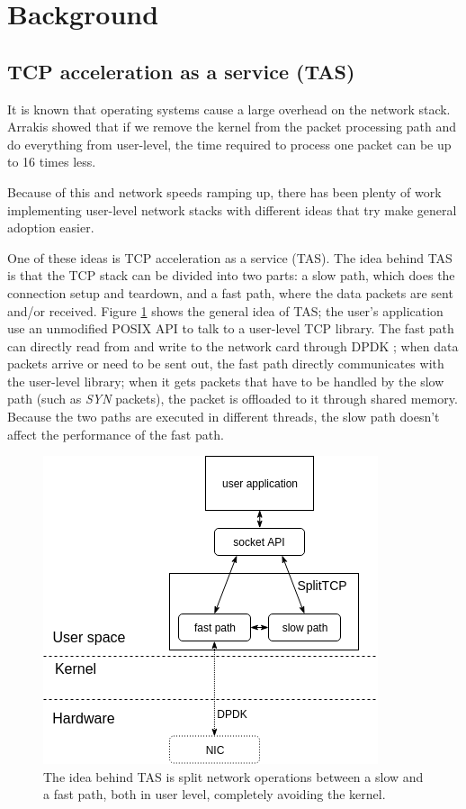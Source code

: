 \section{Background}\label{Background}

%
%

\subsection{TCP acceleration as a service (TAS)}

It is known that operating systems cause a large overhead on the network
stack. Arrakis \cite{peter:arrakis} showed that if we remove the kernel
from the packet processing path and do everything from user-level, the time 
required to process one packet can be up to 16 times less.

Because of this and network speeds ramping up, there has been plenty of work implementing
user-level network stacks \cite{mtcp, utcp, janus, alpine, lwip, fstack} with different ideas that try make general adoption
easier.

One of these ideas is TCP acceleration as a service (TAS).
The idea behind TAS is that the TCP stack can be divided into two parts: a slow path, which does the connection
setup and teardown, and a fast path, where the data packets are sent and/or received. Figure \ref{fig:splittcp} 
shows the general idea of TAS; the user's application use an unmodified POSIX API to talk to a user-level TCP
library. The fast path can directly read from and write to the network card through DPDK \cite{dpdk}; when data packets
arrive or need to be sent out, the fast path directly communicates with the user-level library;
when it gets packets that have to be handled by the slow path (such as \textit{SYN} packets), the packet 
is offloaded to it through shared memory. Because the two paths are executed in different threads, the slow path doesn't
affect the performance of the fast path.


\begin{figure}
\centering
\includegraphics[width=0.7\columnwidth]{figures/splittcp_default.png}
\caption{The idea behind TAS is split network operations between a slow and a fast path, both in user level, completely
avoiding the kernel.}
\label{fig:splittcp}
\end{figure}


